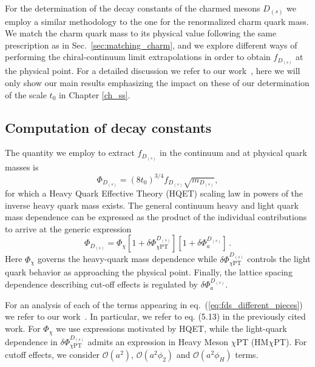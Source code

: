 For the determination of the decay constants of the charmed mesons $D_{(s)}$ we employ a similar methodology to the one for the renormalized charm quark mass. We match the charm quark mass to its physical value following the same prescription as in Sec.~\ref{sec:matching_charm}, and we explore different ways of performing the chiral-continuum limit extrapolations in order to obtain $f_{D_{(s)}}$ at the physical point. For a detailed discussion we refer to our work~\citep{charm}, here we will only show our main results emphasizing the impact on these of our determination of the scale $t_0$ in Chapter \ref{ch_ss}.

\subsection{Computation of decay constants}

The quantity we employ to extract $f_{D_{(s)}}$ in the continuum and at physical quark masses is
\begin{equation}
  \Phi_{D_{(s)}} = (8t_0)^{3/4}f_{D_{(s)}} \sqrt{m_{D_{(s)}}},
  \label{eq:defphiD}
\end{equation}
for which a Heavy Quark Effective Theory (HQET) scaling law in powers of the inverse
heavy quark mass exists.
The general continuum heavy and light quark mass dependence can be expressed as the product of the individual contributions to arrive at the generic expression 
\begin{equation}
	\Phi_{D_{(s)}} = \Phi_{\chi} \left[
	1 + \delta\Phi_{\chi\mathrm{PT}}^{D_{(s)}}
	\right]
	\left[
	1 + \delta\Phi_a^{D_{(s)}}
	\right]\,.
	\label{eq:fds_different_pieces}
\end{equation}
Here $\Phi_\chi$ governs the heavy-quark mass dependence while  $\delta\Phi_{\chi\mathrm{PT}}^{D_{(s)}}$ controls the light quark behavior as approaching the physical point. Finally, the lattice spacing dependence describing cut-off effects is regulated by $\delta\Phi_a^{D_{(s)}}$. 

For an analysis of each of the terms appearing in eq.~(\ref{eq:fds_different_pieces}) we refer to our work~\citep{charm}. In particular, we refer to eq. (5.13) in the previously cited work. For $\Phi_{\chi}$ we use expressions motivated by HQET, while the light-quark dependence in $\delta\Phi_{\chi\mathrm{PT}}^{D_{(s)}}$ admits an expression in Heavy Meson $\chi$PT (HM$\chi$PT). For cutoff effects, we consider $\mathcal{O}(a^2)$, $\mathcal{O}(a^2\phi_2)$ and $\mathcal{O}(a^2\phi_H)$ terms.

